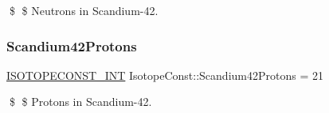 \$ \$ Neutrons in Scandium-\/42. \mbox{\label{group___isotope_const-_scandium-_sc42_gab815aa4d78499d8790bb54d6227cc0d5}} 
\subsubsection{\texorpdfstring{Scandium42\+Protons}{Scandium42Protons}}
{\footnotesize\ttfamily \mbox{\hyperlink{group___isotope_const-_macros_ga5f18360b3e99483a35c32d789e62621c}{I\+S\+O\+T\+O\+P\+E\+C\+O\+N\+S\+T\+\_\+\+I\+NT}} Isotope\+Const\+::\+Scandium42\+Protons = 21}

\$ \$ Protons in Scandium-\/42. 